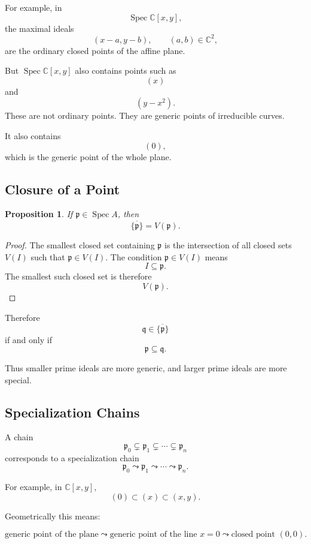 \documentclass[12pt,a4paper]{article}
\newtheorem{proposition}{Proposition}[section]
\newcommand{\C}{\mathbb{C}}
\newcommand{\Spec}{\operatorname{Spec}}
\newcommand{\mfp}{\mathfrak p}
\newcommand{\mfq}{\mathfrak q}
\begin{document}
For example, in
\[
\Spec\C[x,y],
\]
the maximal ideals
\[
(x-a,y-b),\qquad (a,b)\in\C^2,
\]
are the ordinary closed points of the affine plane.

But \(\Spec\C[x,y]\) also contains points such as
\[
(x)
\]
and
\[
(y-x^2).
\]
These are not ordinary points. They are generic points of irreducible curves.

It also contains
\[
(0),
\]
which is the generic point of the whole plane.

\subsection{Closure of a Point}

\begin{proposition}
	If \(\mfp\in\Spec A\), then
	\[
	\overline{\{\mfp\}}=V(\mfp).
	\]
\end{proposition}

\begin{proof}
	The smallest closed set containing \(\mfp\) is the intersection of all closed
	sets \(V(I)\) such that \(\mfp\in V(I)\). The condition \(\mfp\in V(I)\) means
	\[
	I\subseteq\mfp.
	\]
	The smallest such closed set is therefore
	\[
	V(\mfp).
	\]
\end{proof}

Therefore
\[
\mfq\in\overline{\{\mfp\}}
\]
if and only if
\[
\mfp\subseteq\mfq.
\]

Thus smaller prime ideals are more generic, and larger prime ideals are more
special.

\subsection{Specialization Chains}

A chain
\[
\mfp_0\subsetneq \mfp_1\subsetneq \cdots \subsetneq \mfp_n
\]
corresponds to a specialization chain
\[
\mfp_0\leadsto \mfp_1\leadsto\cdots\leadsto\mfp_n.
\]

For example, in \(\C[x,y]\),
\[
(0)\subset (x)\subset (x,y).
\]

Geometrically this means:

\[
\text{generic point of the plane}
\leadsto
\text{generic point of the line }x=0
\leadsto
\text{closed point }(0,0).
\]

\begin{center}
\end{center}
\end{document}
